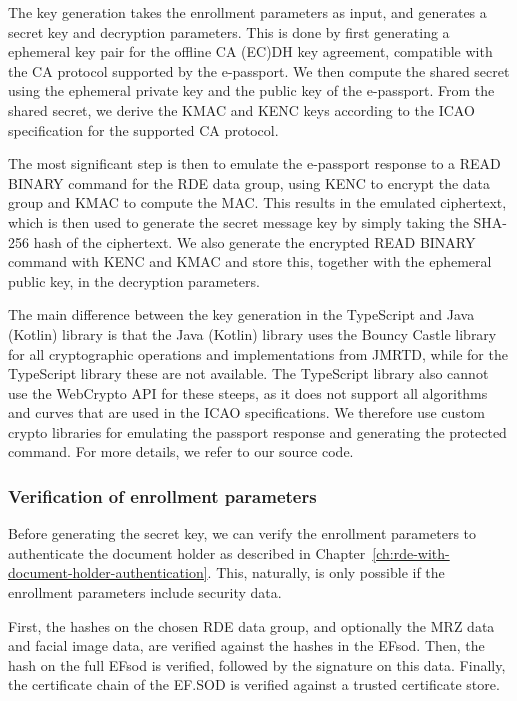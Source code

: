 The key generation takes the enrollment parameters as input, and generates a secret key and decryption parameters.
This is done by first generating a ephemeral key pair for the offline CA (EC)DH key agreement, compatible with the CA protocol supported by the e-passport.
We then compute the shared secret using the ephemeral private key and the public key of the e-passport.
From the shared secret, we derive the KMAC and KENC keys according to the ICAO specification for the supported CA protocol.

The most significant step is then to emulate the e-passport response to a READ BINARY command for the RDE data group, using KENC to encrypt the data group and KMAC to compute the MAC.
This results in the emulated ciphertext, which is then used to generate the secret message key by simply taking the SHA-256 hash of the ciphertext.
We also generate the encrypted READ BINARY command with KENC and KMAC and store this, together with the ephemeral public key, in the decryption parameters.

The main difference between the key generation in the TypeScript and Java (Kotlin) library is that the Java (Kotlin) library uses the Bouncy Castle library for all cryptographic operations and implementations from JMRTD, while for the TypeScript library these are not available.
The TypeScript library also cannot use the WebCrypto API for these steeps, as it does not support all algorithms and curves that are used in the ICAO specifications.
We therefore use custom crypto libraries for emulating the passport response and generating the protected command.
For more details, we refer to our source code.

\subsubsection{Verification of enrollment parameters}\label{subsubsec:verification-of-enrollment-parameters}
Before generating the secret key, we can verify the enrollment parameters to authenticate the document holder as described in Chapter~\ref{ch:rde-with-document-holder-authentication}.
This, naturally, is only possible if the enrollment parameters include security data.

First, the hashes on the chosen RDE data group, and optionally the MRZ data and facial image data, are verified against the hashes in the EFsod.
Then, the hash on the full EFsod is verified, followed by the signature on this data.
Finally, the certificate chain of the EF.SOD is verified against a trusted certificate store.

